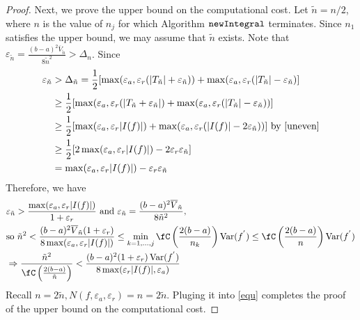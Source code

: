 \documentclass{iitthesis}
\DeclareMathOperator{\newinteg}{\texttt{\textup{newIntegral}}}
\DeclareMathOperator{\Var}{Var}
\newcommand{\oV}{\overline{V}}
\begin{document}
\begin{proof}
Next, we prove the upper bound on the computational cost. Let $\tilde{n}=n/2$, where $n$ is the value of $n_j$ for which Algorithm $\newinteg$ terminates.  Since $n_1$ satisfies the upper bound, we may assume that $\tilde{n}$ exists. Note that $\varepsilon_{\tilde{n}}=\frac{(b-a)^{2}\displaystyle\oV_{\tilde{n}}}{8\tilde{n}^{2}}>\Delta_n$.
Since 
\begin{align*}
\varepsilon_{\tilde{n}}& >\Delta_{\tilde{n}}=\frac{1}{2}[\max(\varepsilon_{a},\varepsilon_{r}(|T_{\tilde{n}}|+\varepsilon_{\tilde{n}}))+\max(\varepsilon_{a},\varepsilon_{r}(|T_{\tilde{n}}|-\varepsilon_{\tilde{n}})]\\
&\geq\frac{1}{2}[\max(\varepsilon_{a},\varepsilon_{r}(|T_{\tilde{n}}+\varepsilon_{\tilde{n}}|)+\max(\varepsilon_{a},\varepsilon_{r}(|T_{\tilde{n}}|-\varepsilon_{\tilde{n}}))]\\
&\geq\frac{1}{2}[\max(\varepsilon_{a},\varepsilon_{r}|I(f)|)+\max(\varepsilon_{a},\varepsilon_{r}(|I(f)|-2\varepsilon_{\tilde{n}}))]   \text{\  by } \eqref{uneven}\\
&\geq \frac{1}{2}[2\max(\varepsilon_{a},\varepsilon_{r}|I(f)|)-2\varepsilon_{r}\varepsilon_{\tilde{n}}]\\
&=\max(\varepsilon_{a},\varepsilon_{r}|I(f)|)-\varepsilon_{r}\varepsilon_{\tilde{n}}
\end{align*} 
Therefore, we have 
\begin{align}\label{equ}
\begin{split}
&\varepsilon_{\tilde{n}}>\frac{\max(\varepsilon_{a},\varepsilon_{r}|I(f)|)}{1+\varepsilon_{r}} 
\text{ and } \varepsilon_{\tilde{n}}=\frac{(b-a)^{2}\displaystyle\oV_{\tilde{n}}}{8\tilde{n}^{2}},\\
&\text{so  } \tilde{n}^{2}<\frac{(b-a)^{2}\displaystyle\oV_{\tilde{n}}(1+\varepsilon_{r})}{8\max(\varepsilon_{a},\varepsilon_{r}|I(f)|)}\leq\min_{k=1, \ldots, j} \fC\left(\frac{2(b-a)}{n_k}\right)\Var(f^{'})\leq\fC\left(\frac{2(b-a)}{n}\right)\Var(f^{'})\\
&\Rightarrow \frac{\tilde{n}^{2}}{\fC\left(\frac{2(b-a)}{\tilde{n}}\right)}<\frac{(b-a)^{2}(1+\varepsilon_{r})\Var(f^{'})}{8\max(\varepsilon_{r}|I(f)|,\varepsilon_{a})}
\end{split}
\end{align}
Recall $n=2\tilde{n}, N(f,\varepsilon_a,\varepsilon_r)=n=2\tilde{n}$. Pluging it into \eqref{equ} completes the proof of the upper bound on the computational cost.
\end{proof}
\end{document}
